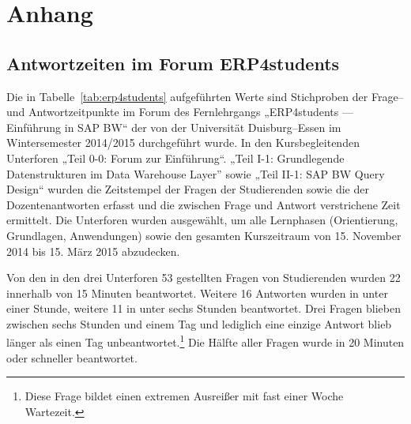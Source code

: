 \appendix
\section*{Anhang}


\subsection*{Antwortzeiten im Forum ERP4students} %
\label{sub:antwortzeiten_im_forum_erp4students}

Die in Tabelle~\ref{tab:erp4students} aufgeführten Werte sind Stichproben der Frage– und Antwortzeitpunkte im Forum des Fernlehrgangs „ERP4students — Einführung in SAP BW“ der von der Universität Duisburg–Essen im Wintersemester 2014/2015 durchgeführt wurde. In den Kursbegleitenden Unterforen „Teil 0-0: Forum zur Einführung“. „Teil I-1: Grundlegende Datenstrukturen im Data Warehouse Layer” sowie „Teil II-1: SAP BW Query Design“ wurden die Zeitstempel der Fragen der Studierenden sowie die der Dozentenantworten erfasst und die zwischen Frage und Antwort verstrichene Zeit ermittelt. Die Unterforen wurden ausgewählt, um alle Lernphasen (Orientierung, Grundlagen, Anwendungen) sowie den gesamten Kurszeitraum von 15. November 2014 bis 15. März 2015 abzudecken.

Von den in den drei Unterforen 53 gestellten Fragen von Studierenden wurden 22 innerhalb von 15 Minuten beantwortet. Weitere 16 Antworten wurden in unter einer Stunde, weitere 11 in unter sechs Stunden beantwortet. Drei Fragen blieben zwischen sechs Stunden und einem Tag und lediglich eine einzige Antwort blieb länger als einen Tag unbeantwortet.\footnote{Diese Frage bildet einen extremen Ausreißer mit fast einer Woche Wartezeit.} Die Hälfte aller Fragen wurde in 20 Minuten oder schneller beantwortet.

